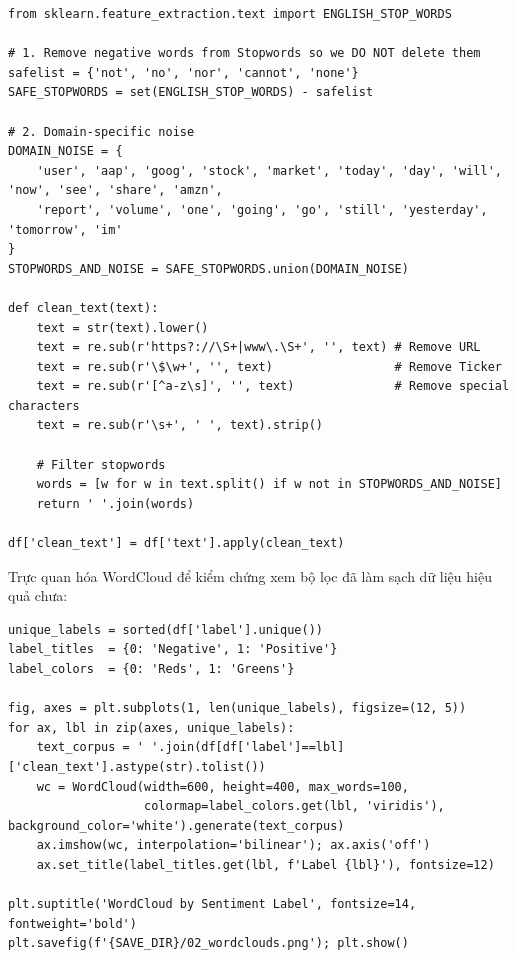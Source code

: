 \begin{lstlisting}[style=pythoncode, caption={Hàm loại bỏ nhiễu và bảo toàn từ mang nghĩa phủ định}]
from sklearn.feature_extraction.text import ENGLISH_STOP_WORDS

# 1. Remove negative words from Stopwords so we DO NOT delete them
safelist = {'not', 'no', 'nor', 'cannot', 'none'} 
SAFE_STOPWORDS = set(ENGLISH_STOP_WORDS) - safelist

# 2. Domain-specific noise
DOMAIN_NOISE = {
    'user', 'aap', 'goog', 'stock', 'market', 'today', 'day', 'will', 'now', 'see', 'share', 'amzn', 
    'report', 'volume', 'one', 'going', 'go', 'still', 'yesterday', 'tomorrow', 'im' 
}
STOPWORDS_AND_NOISE = SAFE_STOPWORDS.union(DOMAIN_NOISE)

def clean_text(text):
    text = str(text).lower()
    text = re.sub(r'https?://\S+|www\.\S+', '', text) # Remove URL
    text = re.sub(r'\$\w+', '', text)                 # Remove Ticker
    text = re.sub(r'[^a-z\s]', '', text)              # Remove special characters
    text = re.sub(r'\s+', ' ', text).strip()
    
    # Filter stopwords
    words = [w for w in text.split() if w not in STOPWORDS_AND_NOISE]
    return ' '.join(words)

df['clean_text'] = df['text'].apply(clean_text)
\end{lstlisting}

Trực quan hóa WordCloud để kiểm chứng xem bộ lọc đã làm sạch dữ liệu hiệu quả chưa:

\begin{lstlisting}[style=pythoncode, caption={Vẽ WordCloud cho 2 phân lớp (Tích cực / Tiêu cực)}]
unique_labels = sorted(df['label'].unique())
label_titles  = {0: 'Negative', 1: 'Positive'}
label_colors  = {0: 'Reds', 1: 'Greens'}

fig, axes = plt.subplots(1, len(unique_labels), figsize=(12, 5))
for ax, lbl in zip(axes, unique_labels):
    text_corpus = ' '.join(df[df['label']==lbl]['clean_text'].astype(str).tolist())
    wc = WordCloud(width=600, height=400, max_words=100,
                   colormap=label_colors.get(lbl, 'viridis'), background_color='white').generate(text_corpus)
    ax.imshow(wc, interpolation='bilinear'); ax.axis('off')
    ax.set_title(label_titles.get(lbl, f'Label {lbl}'), fontsize=12)

plt.suptitle('WordCloud by Sentiment Label', fontsize=14, fontweight='bold')
plt.savefig(f'{SAVE_DIR}/02_wordclouds.png'); plt.show()
\end{lstlisting}

